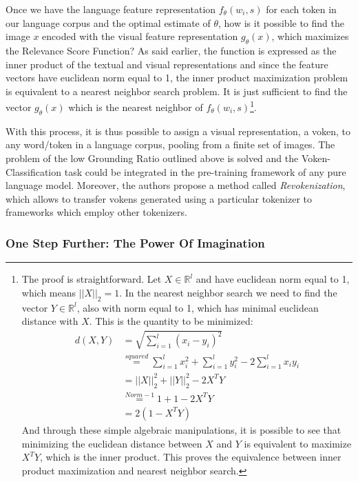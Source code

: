 \documentclass[
]{krantz}
\begin{document}
Once we have the language feature representation \(f_{\theta}(w_i,s)\) for each token in our language corpus and the optimal estimate of \(\theta\), how is it possible to find the image \(x\) encoded with the visual feature representation \(g_{\theta}(x)\), which maximizes the Relevance Score Function? As said earlier, the function is expressed as the inner product of the textual and visual representations and since the feature vectors have euclidean norm equal to 1, the inner product maximization problem is equivalent to a nearest neighbor search problem. It is just sufficient to find the vector \(g_{\theta}(x)\) which is the nearest neighbor of \(f_{\theta}(w_i,s)\)\footnote{The proof is straightforward. Let \(X\in \mathbb{R}^l\) and have euclidean norm equal to 1, which means \(||X||_{2}=1\). In the nearest neighbor search we need to find the vector \(Y\in \mathbb{R}^l\), also with norm equal to 1, which has minimal euclidean distance with \(X\). This is the quantity to be minimized:
  \begin{align*}
  d(X,Y) &=\sqrt{\sum_{i=1}^{l}{(x_i-y_i)^2}}
    \\&\stackrel{squared}{=} \sum_{i=1}^{l}{x_i^2}+\sum_{i=1}^{l}{y_i^2}-2\sum_{i=1}^{l}{x_iy_i}
    \\&\stackrel{}{=}||X||_{2}^2+||Y||_2^2-2X^TY
    \\&\stackrel{Norm-1}{=}1+1-2X^TY
    \\&\stackrel{}{=}2(1-X^TY)
  \end{align*}
  And through these simple algebraic manipulations, it is possible to see that minimizing the euclidean distance between \(X\) and \(Y\) is equivalent to maximize \(X^TY\), which is the inner product. This proves the equivalence between inner product maximization and nearest neighbor search.}.

With this process, it is thus possible to assign a visual representation, a voken, to any word/token in a language corpus, pooling from a finite set of images. The problem of the low Grounding Ratio outlined above is solved and the Voken-Classification task could be integrated in the pre-training framework of any pure language model. Moreover, the authors propose a method called \emph{Revokenization}, which allows to transfer vokens generated using a particular tokenizer to frameworks which employ other tokenizers.

\hypertarget{one-step-further-the-power-of-imagination}{%
\subsubsection{One Step Further: The Power Of Imagination}\label{one-step-further-the-power-of-imagination}}
\end{document}
